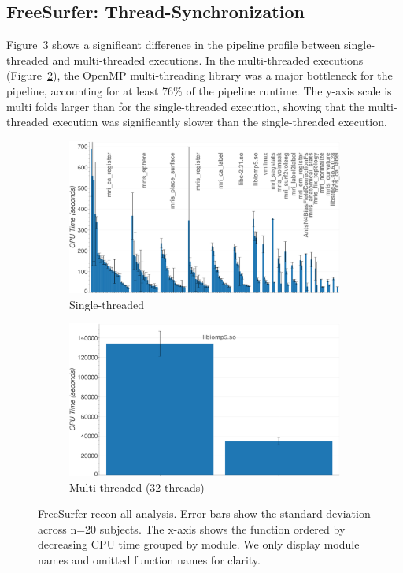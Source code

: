 \documentclass[conference]{IEEEtran}
\begin{document}
\subsection{FreeSurfer: Thread-Synchronization}
Figure~\ref{fig:hotspots-freesurfer-reconall} shows a significant difference in the pipeline profile between single-threaded and multi-threaded executions. In the multi-threaded executions (Figure~\ref{subfig:hotspots-freesurfer-reconall-32threads}), the OpenMP multi-threading library was a major bottleneck for the pipeline, accounting for at least 76\% of the pipeline runtime. The y-axis scale is multi folds larger than for the single-threaded execution, showing that the multi-threaded execution was significantly slower than the single-threaded execution.
					
\begin{figure}[ht]
	\centering
	\begin{subfigure}[t]{0.49\textwidth}
		\caption{Single-threaded}
		\label{subfig:hotspots-freesurfer-reconall-1thread}
		\includegraphics[width=\textwidth]{figures/hotspots-1threads-freesurfer-reconall-simple.png}
	\end{subfigure}
	\begin{subfigure}[t]{0.49\textwidth}
		\caption{Multi-threaded (32 threads)}
		\label{subfig:hotspots-freesurfer-reconall-32threads}
		\includegraphics[width=\textwidth]{figures/hotspots-32threads-freesurfer-reconall-simple.png}
	\end{subfigure}
	\caption{FreeSurfer recon-all analysis. Error bars show the standard deviation across n=20 subjects. The x-axis shows the function ordered by decreasing CPU time grouped by module. We only display module names and omitted function names for clarity.}
	\label{fig:hotspots-freesurfer-reconall}
\end{figure}
\end{document}
